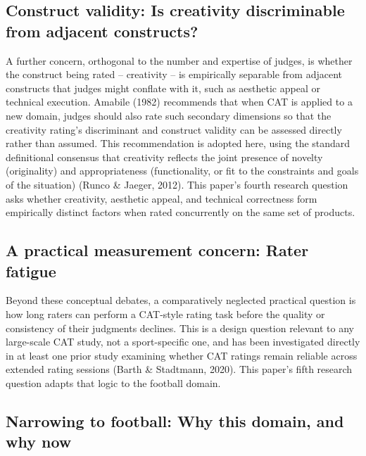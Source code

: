 \documentclass[
  12pt,
]{article}
\begin{document}
\subsection{Construct validity: Is creativity discriminable from
adjacent
constructs?}\label{construct-validity-is-creativity-discriminable-from-adjacent-constructs}

A further concern, orthogonal to the number and expertise of judges, is
whether the construct being rated -- creativity -- is empirically
separable from adjacent constructs that judges might conflate with it,
such as aesthetic appeal or technical execution. Amabile (1982)
recommends that when CAT is applied to a new domain, judges should also
rate such secondary dimensions so that the creativity rating's
discriminant and construct validity can be assessed directly rather than
assumed. This recommendation is adopted here, using the standard
definitional consensus that creativity reflects the joint presence of
novelty (originality) and appropriateness (functionality, or fit to the
constraints and goals of the situation) (Runco \& Jaeger, 2012). This
paper's fourth research question asks whether creativity, aesthetic
appeal, and technical correctness form empirically distinct factors when
rated concurrently on the same set of products.

\subsection{A practical measurement concern: Rater
fatigue}\label{a-practical-measurement-concern-rater-fatigue}

Beyond these conceptual debates, a comparatively neglected practical
question is how long raters can perform a CAT-style rating task before
the quality or consistency of their judgments declines. This is a design
question relevant to any large-scale CAT study, not a sport-specific
one, and has been investigated directly in at least one prior study
examining whether CAT ratings remain reliable across extended rating
sessions (Barth \& Stadtmann, 2020). This paper's fifth research
question adapts that logic to the football domain.

\subsection{Narrowing to football: Why this domain, and why
now}\label{narrowing-to-football-why-this-domain-and-why-now}
\end{document}
